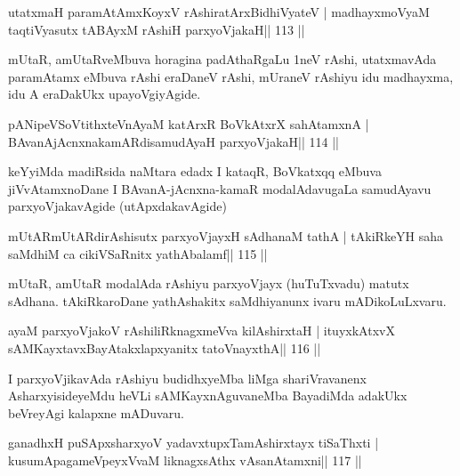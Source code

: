 \begin{shl}
utatxmaH paramAtAmxKoyxV rAshiratArxBidhiVyateV |
madhayxmoV\s yaM taqtiVyasutx tABAyxM rAshiH parxyoVjakaH\hfill || 113 ||
\end{shl}

\begin{artha}
mUtaR, amUtaRveMbuva horagina padAthaRgaLu 1neV rAshi, utatxmavAda paramAtamx eMbuva rAshi eraDaneV rAshi, mUraneV rAshiyu idu madhayxma, idu A eraDakUkx upayoVgiyAgide.
\end{artha}


\begin{shl}
pANipeVSoVtithxteVnAyaM katArxR BoVkAtxrX sahA\s\s tamxnA |
BAvanAjAcnxnakamARdisamudAyaH parxyoVjakaH\hfill || 114 ||
\end{shl}

\begin{artha}
keYyiMda madiRsida naMtara edadx I kataqR, BoVkatxqq eMbuva
jiVvAtamxnoDane I BAvanA-jAcnxna-kamaR modalAdavugaLa samudAyavu
parxyoVjakavAgide (utApxdakavAgide)
\end{artha}

\begin{shl}
mUtARmUtARdirAshisutx parxyoVjayxH sAdhanaM tathA |
tAkiRkeYH saha saMdhiM ca cikiVSaRnitx yathAbalamf\hfill || 115 ||
\end{shl}

\begin{artha}
mUtaR, amUtaR modalAda rAshiyu parxyoVjayx (huTuTxvadu) matutx sAdhana.
tAkiRkaroDane yathAshakitx saMdhiyanunx ivaru mADikoLuLxvaru. 
\end{artha}

\begin{shl}
ayaM parxyoVjakoV rAshiliRknagxmeVva kilA\s\s shirxtaH |
ituyxkAtxvX sAMKayxtavxBayAtakxlapxyanitx tatoV\s nayxthA\hfill || 116 ||
\end{shl}

\begin{artha}
I parxyoVjikavAda rAshiyu budidhxyeMba liMga shariVravanenx
AsharxyisideyeMdu heVLi sAMKayxnAguvaneMba BayadiMda adakUkx beVreyAgi
kalapxne mADuvaru.
\end{artha}



\begin{shl}
ganadhxH puSApxsharxyoV yadavxtupxTamAshirxtayx tiSaThxti |
kusumApagameV\s peyxVvaM liknagxsAthx vAsanA\s\s tamxni\hfill || 117 ||
\end{shl}

